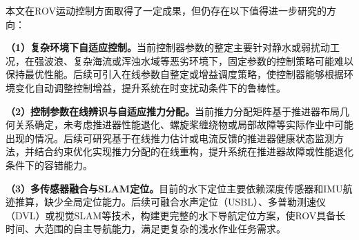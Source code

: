 本文在ROV运动控制方面取得了一定成果，但仍存在以下值得进一步研究的方向：

\textbf{（1）复杂环境下自适应控制。}当前控制器参数的整定主要针对静水或弱扰动工况，在强波浪、复杂海流或浑浊水域等恶劣环境下，固定参数的控制策略可能难以保持最优性能。后续可引入在线参数自整定或增益调度策略，使控制器能够根据环境变化自动调整控制增益，提升系统在时变扰动条件下的鲁棒性。

\textbf{（2）控制参数在线辨识与自适应推力分配。}当前推力分配矩阵基于推进器布局几何关系确定，未考虑推进器性能退化、螺旋桨缠绕物或局部故障等实际作业中可能出现的情况。后续可研究基于在线推力估计或电流反馈的推进器健康状态监测方法，并结合约束优化实现推力分配的在线重构，提升系统在推进器故障或性能退化条件下的容错能力。

\textbf{（3）多传感器融合与SLAM定位。}目前的水下定位主要依赖深度传感器和IMU航迹推算，缺少全局定位能力。后续可融合水声定位（USBL）、多普勒测速仪（DVL）或视觉SLAM等技术，构建更完整的水下导航定位方案，使ROV具备长时间、大范围的自主导航能力，满足更复杂的浅水作业任务需求。
